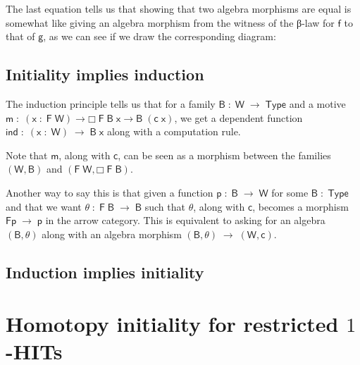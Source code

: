 \documentclass[a4paper,10pt]{article}
\newcommand{\Conid}[1]{\mathit{#1}}
\newcommand{\Varid}[1]{\mathit{#1}}
\renewcommand\Varid[1]{\mathord{\textsf{#1}}}
\let\Conid\Varid
\newcommand{\todoi}[1]{\todo[inline]{#1}}
\newcommand{\onehits}{$1$-HITs\xspace}
\begin{document}
The last equation tells us that showing that two algebra morphisms are
equal is somewhat like giving an algebra morphism from the witness of
the β-law for \ensuremath{\Varid{f}} to that of \ensuremath{\Varid{g}}, as we can see if we draw the
corresponding diagram:

\todoi{comm diag}



\subsection{Initiality implies induction}

The induction principle tells us that for a family \ensuremath{\Conid{B}\;\mathbin{:}\;\Conid{W}\;\to \;\Conid{Type}} and
a motive \ensuremath{\Varid{m}\;\mathbin{:}\;(\Varid{x}\;\mathbin{:}\;\Conid{F}\;\Conid{W})\;\Varid{→}\;\Varid{□}\;\Conid{F}\;\Conid{B}\;\Varid{x}\;\Varid{→}\;\Conid{B}\;(\Varid{c}\;\Varid{x})}, we get a dependent
function \ensuremath{\Varid{ind}\;\mathbin{:}\;(\Varid{x}\;\mathbin{:}\;\Conid{W})\;\to \;\Conid{B}\;\Varid{x}} along with a computation rule.

Note that \ensuremath{\Varid{m}}, along with \ensuremath{\Varid{c}}, can be seen as a morphism between the
families \ensuremath{(\Conid{W},\Conid{B})} and \ensuremath{(\Conid{F}\;\Conid{W},\Varid{□}\;\Conid{F}\;\Conid{B})}.

Another way to say this is that given a function \ensuremath{\Varid{p}\;\mathbin{:}\;\Conid{B}\;\to \;\Conid{W}} for some
\ensuremath{\Conid{B}\;\mathbin{:}\;\Conid{Type}} and that we want \ensuremath{\Varid{θ}\;\mathbin{:}\;\Conid{F}\;\Conid{B}\;\to \;\Conid{B}} such that \ensuremath{\Varid{θ}}, along with
\ensuremath{\Varid{c}}, becomes a morphism \ensuremath{\Conid{Fp}\;\to \;\Varid{p}} in the arrow category. This is
equivalent to asking for an algebra \ensuremath{(\Conid{B},\Varid{θ})} along with an algebra
morphism \ensuremath{(\Conid{B},\Varid{θ})\;\to \;(\Conid{W},\Varid{c})}.



\subsection{Induction implies initiality}


\section{Homotopy initiality for restricted \onehits}
\end{document}

